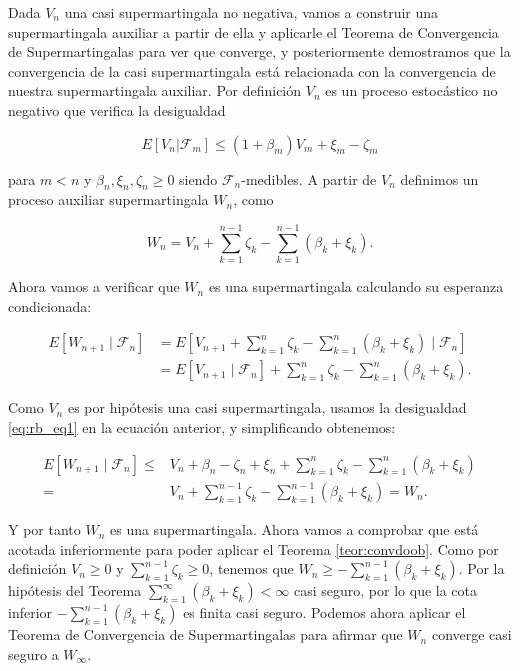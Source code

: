 Dada $V_n$ una casi supermartingala no negativa, vamos a construir una supermartingala auxiliar a partir de ella y aplicarle el Teorema de Convergencia de Supermartingalas para ver que converge, y posteriormente demostramos que la convergencia de la casi supermartingala está relacionada con la convergencia de nuestra supermartingala auxiliar. Por definición $V_n$ es un proceso estocástico no negativo que verifica la desigualdad

\begin{equation}\label{eq:rb_eq1}
	E[V_n | \mathcal{F}_m] \leq (1 + \beta _m ) V_m + \xi _m - \zeta _m
\end{equation}

para $m<n$ y $\beta _n, \xi _n, \zeta _n \geq 0$ siendo $\mathcal{F}_n$-medibles. A partir de $V_n$ definimos un proceso auxiliar supermartingala $W_n$, como


\begin{equation*}
	W_n = V_n + \sum_{k=1}^{n-1} \zeta_k - \sum_{k=1}^{n-1} (\beta_k + \xi_k).
\end{equation*}

Ahora vamos a verificar que $W_n$ es una supermartingala calculando su esperanza condicionada:

\begin{align*}
E[W_{n+1} \mid \mathcal{F}_n] 
&= E\left[V_{n+1} + \sum_{k=1}^n \zeta_k - \sum_{k=1}^n (\beta_k + \xi_k) \mid \mathcal{F}_n\right] \\
&= E[V_{n+1} \mid \mathcal{F}_n] + \sum_{k=1}^n \zeta_k - \sum_{k=1}^n (\beta_k + \xi_k).
\end{align*}

Como $V_n$ es por hipótesis una casi supermartingala, usamos la desigualdad \eqref{eq:rb_eq1} en la ecuación anterior, y simplificando obtenemos:

\begin{align*}
E[W_{n+1} \mid \mathcal{F}_n] \leq& V_n + \beta_n - \zeta_n + \xi_n + \sum_{k=1}^n \zeta_k - \sum_{k=1}^n (\beta_k + \xi_k) \\
=& V_n + \sum_{k=1}^{n-1} \zeta_k - \sum_{k=1}^{n-1} (\beta_k + \xi_k) = W_n.
\end{align*}

Y por tanto $W_n$ es una supermartingala. Ahora vamos a comprobar que está acotada inferiormente para poder aplicar el Teorema \ref{teor:convdoob}. Como por definición $V_n \geq 0$ y $\sum_{k=1}^{n-1} \zeta_k \geq 0$, tenemos que $W_n \geq -\sum_{k=1}^{n-1} (\beta_k + \xi_k)$. Por la hipótesis del Teorema $\sum_{k=1}^\infty (\beta_k + \xi_k) < \infty$ casi seguro, por lo que la cota inferior $-\sum_{k=1}^{n-1} (\beta_k + \xi_k)$ es finita casi seguro. Podemos ahora aplicar el Teorema de Convergencia de Supermartingalas para afirmar que $W_n$ converge casi seguro a $W_{\infty}$.

